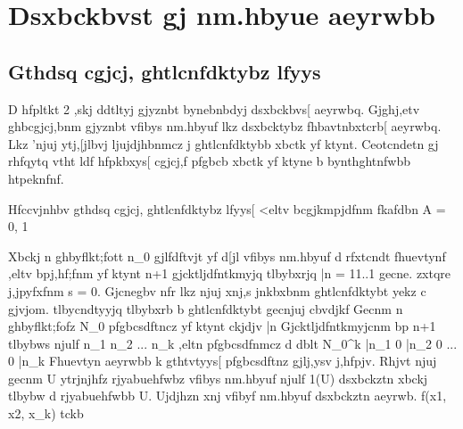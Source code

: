\section{Dsxbckbvst gj nm.hbyue aeyrwbb}

\subsection{Gthdsq cgjcj, ghtlcnfdktybz lfyys}

D hfpltkt 2 ,skj ddtltyj gjyznbt bynebnbdyj dsxbckbvs[ aeyrwbq. Gjghj,etv ghbcgjcj,bnm gjyznbt vfibys nm.hbyuf lkz dsxbcktybz fhbavtnbxtcrb[ aeyrwbq.
Lkz 'njuj ytj,[jlbvj ljujdjhbnmcz j ghtlcnfdktybb xbctk yf ktynt. Ceotcndetn gj rhfqytq vtht ldf hfpkbxys[ cgjcj,f pfgbcb xbctk yf ktyne b bynthghtnfwbb htpeknfnf.

Hfccvjnhbv gthdsq cgjcj, ghtlcnfdktybz lfyys[ <eltv bcgjkmpjdfnm fkafdbn A = {0, 1}

Xbckj n ghbyflkt;fott n_0 gjlfdftvjt yf d[jl vfibys nm.hbyuf d rfxtcndt fhuevtynf ,eltv bpj,hf;fnm yf ktynt n+1 gjcktljdfntkmyjq tlbybxrjq
\bar{n} = 11..1 gecne. zxtqre j,jpyfxfnm s = 0. Gjcnegbv nfr lkz njuj xnj,s jnkbxbnm ghtlcnfdktybt yekz c gjvjom. tlbycndtyyjq tlbybxrb b ghtlcnfdktybt gecnjuj cbvdjkf
Gecnm n ghbyflkt;fofz N_0 pfgbcsdftncz yf ktynt ckjdjv \bar{n}
Gjcktljdfntkmyjcnm bp n+1 tlbybws njulf n_1 n_2 ... n_k ,eltn pfgbcsdfnmcz d dblt N_0^k \bar{n_1} 0 \bar{n_2} 0 ... 0 \bar{n_k}
Fhuevtyn aeyrwbb k gthtvtyys[ pfgbcsdftnz gjlj,ysv j,hfpjv. Rhjvt njuj gecnm U ytrjnjhfz rjyabuehfwbz vfibys nm.hbyuf njulf 1(U) dsxbckztn xbckj tlbybw d rjyabuehfwbb U. Ujdjhzn xnj vfibyf nm.hbyuf dsxbckztn aeyrwb.  f(x1, x2, x_k) tckb


